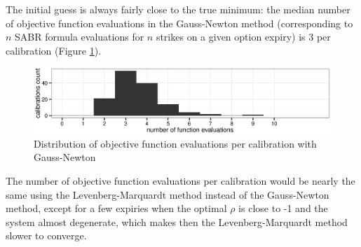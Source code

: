 \documentclass[]{rAMF2e}
\begin{document}
The initial guess is always fairly close to the true minimum: the median number of objective function evaluations in the Gauss-Newton method (corresponding to $n$ SABR formula evaluations for $n$ strikes on a given option expiry) is 3 per calibration (Figure \ref{fig:sabr_fit_iterations}). 
\begin{figure}[!h]
  \caption{\label{fig:sabr_fit_iterations}Distribution of objective function evaluations per calibration with Gauss-Newton}
\begin{center}
 \includegraphics[width=16cm]{sabr_fit_iterations.eps}
\end{center}
\end{figure}
The number of objective function evaluations per calibration would be nearly the same using the Levenberg-Marquardt method instead of the Gauss-Newton method, except for a few expiries when the optimal $\rho$ is close to -1 and the system almost degenerate, which makes then the Levenberg-Marquardt method slower to converge.
\end{document}
